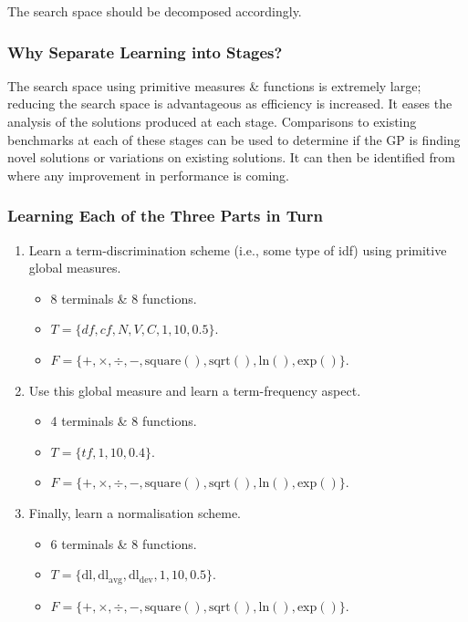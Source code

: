 \documentclass[a4paper,11pt]{article}
\begin{document}
The search space should be decomposed accordingly.

\subsubsection{Why Separate Learning into Stages?}
The search space using primitive measures \& functions is extremely large;
reducing the search space is advantageous as efficiency is increased.
It eases the analysis of the solutions produced at each stage.
Comparisons to existing benchmarks at each of these stages can be used to determine if the GP is finding novel solutions or variations on existing solutions.
It can then be identified from where any improvement in performance is coming.

\subsubsection{Learning Each of the Three Parts in Turn}
\begin{enumerate}
    \item   Learn a term-discrimination scheme (i.e., some type of idf) using primitive global measures.
            \begin{itemize}
                \item   8 terminals \& 8 functions.
                \item   $T = \{\textit{df}, \textit{cf}, N, V, C, 1, 10, 0.5\}$.
                \item   $F = \{+, \times, \div, -, \text{square}(), \text{sqrt}(), \text{ln}(), \text{exp}()\}$.
            \end{itemize}

    \item   Use this global measure and learn a term-frequency aspect.
            \begin{itemize}
                \item   4 terminals \& 8 functions.
                \item   $T = \{\textit{tf}, 1, 10, 0.4\}$.
                \item   $F = \{+, \times, \div, -, \text{square}(), \text{sqrt}(), \text{ln}(), \text{exp}()\}$.
            \end{itemize}

    \item   Finally, learn a normalisation scheme.
            \begin{itemize}
                \item   6 terminals \& 8 functions.
                \item   $T = \{ \text{dl}, \text{dl}_{\text{avg}}, \text{dl}_\text{dev}, 1, 10, 0.5 \}$.
                \item   $F = \{ +, \times, \div, -, \text{square}(), \text{sqrt}(), \text{ln}(), \text{exp}() \}$.
            \end{itemize}
\end{enumerate}
\end{document}
